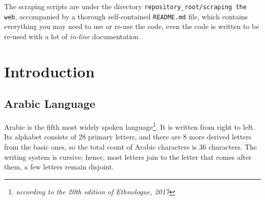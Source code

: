 \documentclass[12pt]{report}
\begin{document}
The scraping scripts are under the directory \texttt{repository\_root/scraping
the web}, accompanied by  a thorough self-contained \texttt{README.md} file,
which contains everything you may need to use or re-use the code, even the code
is written to be re-used with a lot of  \textit{in-line} documentation.























\section{Introduction}
\subsection{Arabic Language}

Arabic is the fifth most widely spoken language\footnote{\textit{according to the
20th edition of Ethnologue, 2017}}. It is written from right to left. Its
alphabet consists of 28 primary letters, and there are 8 more derived letters
from the basic ones, so the total count of Arabic characters is 36 characters.
The writing system is cursive; hence, most letters join to the letter that comes
after them, a few letters remain disjoint.
\end{document}
